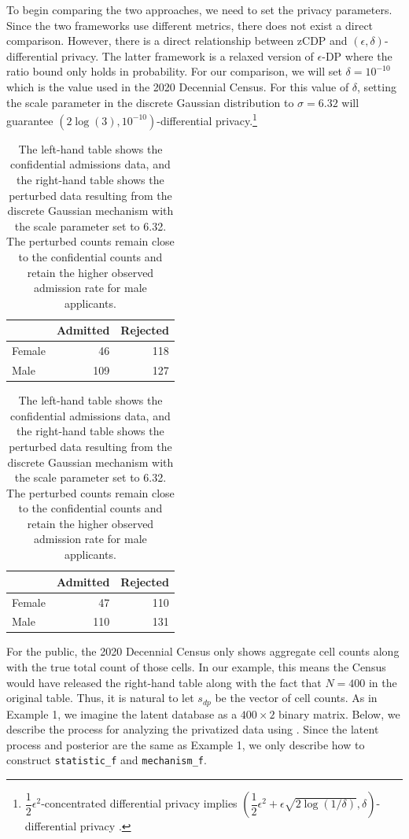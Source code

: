 To begin comparing the two approaches, we need to set the privacy parameters.
Since the two frameworks use different metrics, there does not exist
a direct comparison. However, there is a direct relationship between
zCDP and \((\epsilon, \delta)\)-differential privacy. The latter framework
is a relaxed version of \(\epsilon\)-DP where the ratio bound only holds
in probability. For our comparison, we will set \(\delta = 10^{-10}\) which
is the value used in the 2020 Decennial Census.
For this value of \(\delta\), setting the scale parameter in the discrete Gaussian
distribution to \(\sigma = 6.32\) will guarantee \((2\log(3), 10^{-10})\)-differential privacy.\footnote{\(\dfrac{1}{2} \epsilon^2\)-concentrated differential privacy implies \(\left(\dfrac{1}{2}\epsilon^2 + \epsilon \sqrt{2\log(1/\delta)}, \delta\right)\)-differential privacy \citep{Bun2016}.}

\begin{table}
\centering\caption{\label{tab:admissions-dg}The left-hand table shows the confidential admissions data, and the right-hand table shows the perturbed data resulting from the discrete Gaussian mechanism with the scale parameter set to 6.32. The perturbed counts remain close to the confidential counts and retain the higher observed admission rate for male applicants.}

\centering
\begin{tabular}[t]{lrr}
\toprule
  & Admitted & Rejected\\
\midrule
Female & 46 & 118\\
Male & 109 & 127\\
\bottomrule
\end{tabular}
\centering
\begin{tabular}[t]{lrr}
\toprule
  & Admitted & Rejected\\
\midrule
Female & 47 & 110\\
Male & 110 & 131\\
\bottomrule
\end{tabular}
\end{table}

For the public, the 2020 Decennial Census only shows aggregate cell counts along with
the true total count of those cells. In our example,
this means the Census would have released the right-hand
table along with the fact that \(N = 400\) in the original
table. Thus, it is natural to let \(s_{dp}\) be the vector of cell counts. As in
Example 1, we imagine the latent database as a
\(400 \times 2\) binary matrix. Below,
we describe the process for analyzing the privatized
data using . Since the latent process
and posterior are the same as Example 1, we only describe
how to construct \texttt{statistic\_f} and \texttt{mechanism\_f}.


